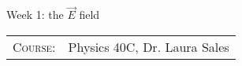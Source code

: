 \documentclass{article}
\begin{document}
\huge{Week 1: the }$\vec E$ field


\begin{tabular}{rl}
\textsc{Course}:
&
Physics 40C, Dr. Laura Sales
\\



	
	
	
\end{tabular}
	
	
	
\end{document}
